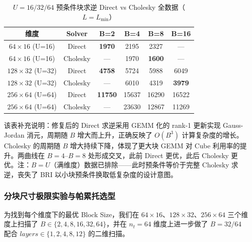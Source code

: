 \documentclass{CjC}
\begin{document}
    \begin{table}[H]
        \centering
        \caption{$U=16/32/64$ 预条件块求逆 Direct vs Cholesky 全数据（$L=L_{\min}$）}
        \begin{tabular}{|c|c|c|c|c|c|}
            \hline
            \textbf{维度}          & \textbf{Solver} & \textbf{B=2}   & \textbf{B=4} & \textbf{B=8}  & \textbf{B=16} \\
            \hline
            $64\times16$ (U=16)  & Direct          & \textbf{1970}  & 2195         & 2327          & —             \\
            $64\times16$ (U=16)  & Cholesky        & —              & 1970         & \textbf{1600} & —             \\
            \hline
            $128\times32$ (U=32) & Direct          & \textbf{4758}  & 5724         & 5988          & 6049          \\
            $128\times32$ (U=32) & Cholesky        & —              & 6010         & 4319          & \textbf{3979} \\
            \hline
            $256\times64$ (U=64) & Direct          & \textbf{11750} & 15637        & 16290         & 16522         \\
            $256\times64$ (U=64) & Cholesky        & —              & 23630        & 12867         & 11269         \\
            \hline
        \end{tabular}
    \end{table}

    该表补充说明：修复后的 Direct 求逆采用 GEMM 化的 rank-1 更新实现 Gauss-Jordan
    消元，周期随 $B$ 增大而上升，正确反映了 $O(B^{3})$
    计算复杂度的增长。Cholesky 的周期随 $B$ 增大持续下降，体现了更大块 GEMM 对
    Cube 利用率的提升。两曲线在 $B=4$--$B=8$ 处形成交叉，此前 Direct 更优，此后 Cholesky
    更优。注：$B=U$（满维度）数据已排除——此时预条件等价于完整 Cholesky 求逆，丧失了
    BRI 以小块预条件换取低复杂度的设计意图。

    \subsubsection{分块尺寸极限实验与帕累托选型}

    为找到每个维度下的最优 Block Size，我们在 $64\times16$、$128\times32$、$256\times
    64$ 三个维度上扫描了 $B\in\{2,4,8,16,32,64\}$，并在 $n_{t}=64$
    维度上进一步做了 $B=32/64$ 配合 $\textit{layers}\in\{1,2,4,8,12\}$
    的二维扫描。
\end{document}
